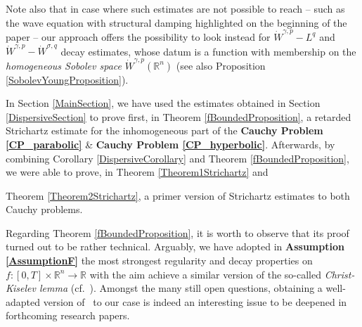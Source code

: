 \documentclass{amsart}
\theoremstyle{definition}
\theoremstyle{remark}
\numberwithin{equation}{section}
\newcommand{\BR}{{\mathbb R}}
\begin{document}
		Note also that in case where such estimates are not possible to reach -- such as the wave equation with structural damping highlighted on the beginning of the paper \cite{CCD08} -- our approach offers the possibility to look instead for $\dot{W}^{\gamma,p}-L^q$ and $\dot{W}^{\gamma,p}-\dot{W}^{\sigma,q}$ decay estimates, whose datum is a function with membership on the {\it homogeneous Sobolev space} $\dot{W}^{\gamma,p}(\BR^n)$ (see also Proposition \ref{SobolevYoungProposition}).
		
		In Section \ref{MainSection}, we have used the estimates obtained in Section \ref{DispersiveSection} to prove first, in Theorem \ref{fBoundedProposition}, a {retarded Strichartz estimate} for the inhomogeneous part of the {\bf Cauchy Problem \ref{CP_parabolic}} \& {\bf Cauchy Problem \ref{CP_hyperbolic}}.  Afterwards, by combining Corollary \ref{DispersiveCorollary} and Theorem \ref{fBoundedProposition}, we were able to prove, in {Theorem \ref{Theorem1Strichartz}} and {Theorem \ref{Theorem2Strichartz}, a primer version of Strichartz estimates to both Cauchy problems.
			
			
			
			Regarding {Theorem \ref{fBoundedProposition}}, it is worth to observe that its proof turned out to be rather technical. Arguably, we have adopted in {\bf Assumption \ref{AssumptionF}} the most strongest regularity and decay properties on  $\displaystyle f:[0,T]\times \BR^n\rightarrow\BR$ with the aim achieve a similar version of the so-called {\it Christ-Kiselev lemma} (cf.~\cite[Lemma 2.4]{Tao06}). Amongst the many still open questions, obtaining a well-adapted version of \cite[THEOREM 1.2.]{KTao98}~to our case is indeed an interesting issue to be deepened in forthcoming research papers.
			
}
\end{document}
